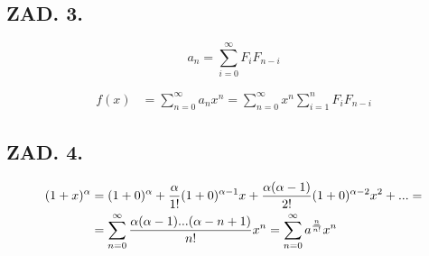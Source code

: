 \documentclass{article}[13pt]
\begin{document}
\subsection*{ZAD. 3.}
$$a_n=\sum\limits_{i=0}^\infty F_iF_{n-i}$$

\begin{align*}
    f(x)&=\sum\limits_{n=0}^\infty a_nx^n=\sum\limits_{n=0}^\infty x^n\sum\limits_{i=1}^n F_iF_{n-i}
\end{align*}

\subsection*{ZAD. 4.}

\begin{align*}
    (1+x)^\alpha&=(1+0)^\alpha+{\alpha\over 1!}(1+0)^{\alpha-1}x+{\alpha(\alpha-1)\over 2!}(1+0)^{\alpha-2}x^2+...=\\
    &=\sum\limits_{n=0}^\infty {\alpha(\alpha-1)...(\alpha-n+1)\over n!}x^n=\sum\limits_{n=0}^\infty a^{\underline{n}\over n!}x^n
\end{align*}
\end{document}
